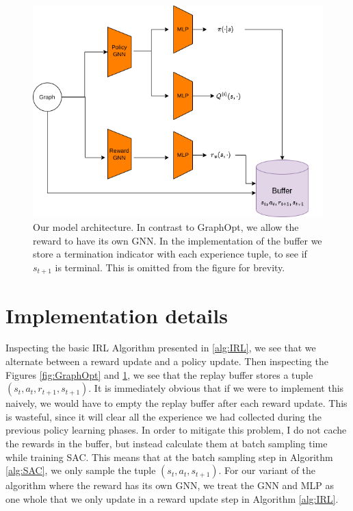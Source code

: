 \documentclass{report}
\numberwithin{equation}{section}
\numberwithin{figure}{section}
\numberwithin{table}{section}
\numberwithin{algorithm}{section}
\begin{document}
\begin{figure}[H]
  \begin{center}
    \includegraphics[scale=0.5]{my_model_architecture.png}
    \caption{\label{fig:OurModel} Our model architecture. In contrast 
    to GraphOpt, we allow the reward to have its own GNN. 
    In the implementation of the buffer we store a 
    termination indicator with 
    each experience tuple, to see if $s_{t+1}$ is terminal. 
    This is omitted from the figure for brevity.}
  \end{center}
\end{figure}


\section{Implementation details}
Inspecting the basic IRL Algorithm presented in \ref{alg:IRL}, 
we see that we alternate between a reward update and a policy 
update. Then inspecting the Figures \ref{fig:GraphOpt} and 
\ref{fig:OurModel}, we see that the replay buffer stores 
a tuple $(s_t, a_t, r_{t+1}, s_{t+1})$. It is immediately 
obvious that if we were to implement this naively, we would 
have to empty the replay buffer after each reward update. 
This is wasteful, since it will clear all the experience 
we had collected during the previous policy learning 
phases. In order to mitigate this problem, I do not 
cache the rewards in the buffer, but instead calculate 
them at batch sampling time while training SAC. 
This means that at the batch sampling step in Algorithm 
\ref{alg:SAC}, we only sample the tuple $(s_t, a_t, s_{t+1})$.
For our variant of the algorithm where the reward has its own 
GNN, we treat the GNN and MLP as one whole that we only update 
in a reward update step in Algorithm \ref{alg:IRL}. 
\end{document}
